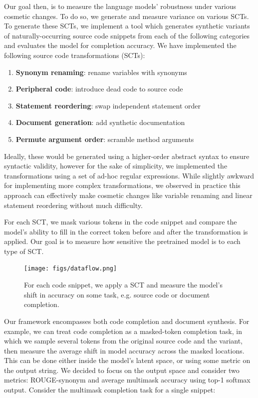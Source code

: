\documentclass[sigconf,review,anonymous]{acmart}
\begin{document}
  Our goal then, is to measure the language models' robustness under various cosmetic changes. To do so, we generate and measure variance on various SCTs. To generate these SCTs, we implement a tool which generates synthetic variants of naturally-occurring source code snippets from each of the following categories and evaluates the model for completion accuracy. We have implemented the following source code transformations (SCTs):

  \begin{enumerate}
    \item \textbf{Synonym renaming}: rename variables with synonyms
    \item \textbf{Peripheral code}: introduce dead code to source code
    \item \textbf{Statement reordering}: swap independent statement order
    \item \textbf{Document generation}: add synthetic documentation
    \item \textbf{Permute argument order}: scramble method arguments
  \end{enumerate}

  Ideally, these would be generated using a higher-order abstract syntax to ensure syntactic validity, however for the sake of simplicity, we implemented the transformations using a set of ad-hoc regular expressions. While slightly awkward for implementing more complex transformations, we observed in practice this approach can effectively make cosmetic changes like variable renaming and linear statement reordering without much difficulty.

  For each SCT, we mask various tokens in the code snippet and compare the model's ability to fill in the correct token before and after the transformation is applied. Our goal is to measure how sensitive the pretrained model is to each type of SCT.

  \begin{figure}[H]
    \centering
    \texttt{[image: figs/dataflow.png]}
    \caption{For each code snippet, we apply a SCT and measure the model's shift in accuracy on some task, e.g. source code or document completion.}
    \label{fig:dataflow}
  \end{figure}

  Our framework encompasses both code completion and document synthesis. For example, we can treat code completion as a masked-token completion task, in which we sample several tokens from the original source code and the variant, then measure the average shift in model accuracy across the masked locations. This can be done either inside the model's latent space, or using some metric on the output string. We decided to focus on the output space and consider two metrics: ROUGE-synonym and average multimask accuracy using top-1 softmax output. Consider the multimask completion task for a single snippet:
\end{document}
